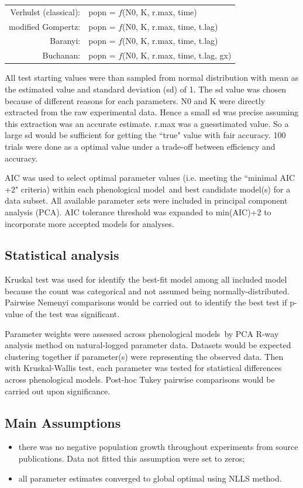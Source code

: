 \documentclass[a4paper, 11pt]{article}
\newcommand{\pml}{phenological model}
\newcommand{\pms}{phenological models}
\newcommand{\fve}{Verhulst (classical)}
\newcommand{\fgo}{modified Gompertz}
\newcommand{\fba}{Baranyi}
\newcommand{\fbu}{Buchanan}
\begin{document}
	\begin{tabular}{rl}
		\fve: & popn = $f$(N0, K, r.max, time)\\
		\fgo: & popn = $f$(N0, K, r.max, time, t.lag)\\
		\fba: & popn = $f$(N0, K, r.max, time, t.lag)\\
		\fbu: & popn = $f$(N0, K, r.max, time, t.lag, gx)
	\end{tabular}
	
	All test starting values were than sampled from normal distribution with mean as the estimated value and standard deviation (sd) of 1.  The sd value was chosen because of different reasons for each parameters.  N0 and K were directly extracted from the raw experimental data.  Hence a small sd was precise assuming this extraction was an accurate estimate. r.max was a guesstimated value.  So a large sd would be sufficient for getting the ``true" value with fair accuracy.  100 trials were done as a optimal value under a trade-off between efficiency and accuracy.
	
	AIC\autocite{johnson2004model,akaike1998information,burnhamdr} was used to select optimal parameter values (i.e. meeting the ``minimal AIC +2"\autocite{burnham2004multimodel} criteria) within each \pml\ and best candidate model(s) for a data subset.  All available parameter sets were included in principal component analysis (PCA).  AIC tolerance threshold was expanded to min(AIC)+2\autocite{burnham2004multimodel} to incorporate more accepted models for analyses.
	
	\subsection*{Statistical analysis}
	Kruskal test was used for identify the best-fit model among all included model because the count was categorical and not assumed being normally-distributed.  Pairwise Nemenyi comparisons would be carried out to identify the best test if p-value of the test was significant.
	
	Parameter weights were assessed across \pms\ by PCA R-way analysis method on natural-logged parameter data.  Datasets would be expected clustering together if parameter(s) were representing the observed data.  Then with Kruskal-Wallis test, each parameter was tested for statistical differences across \pms.  Post-hoc Tukey pairwise comparisons would be carried out upon significance.
	
	\subsection*{Main Assumptions}
	\begin{itemize}
		\item there was no negative population growth throughout experiments from source publications.  Data not fitted this assumption were set to zeros;
		\item all parameter estimates converged to global optimal using NLLS method.
	\end{itemize}
	
\end{document}
